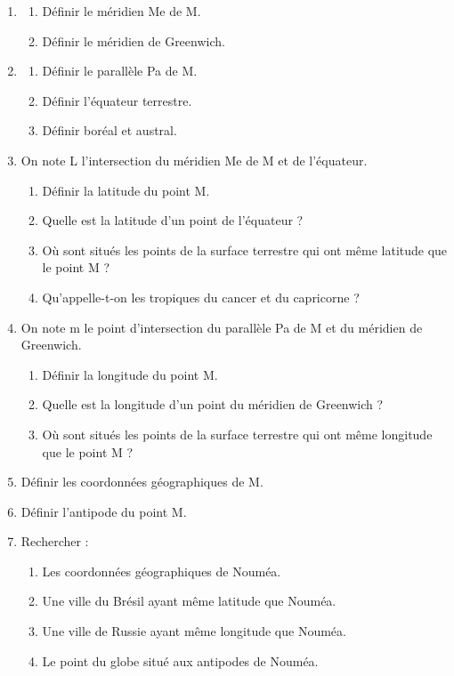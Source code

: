 \begin{multicols}{2}
\begin{enumerate}
\begin{enumerate} 
\item \begin{enumerate}
	\item Définir le méridien Me de M.
	\item Définir le méridien de Greenwich.
		\end{enumerate}
\item \begin{enumerate}
	\item Définir le parallèle Pa de M.
	\item Définir l'équateur terrestre.
	\item Définir boréal et austral.
		\end{enumerate}
\item On note L l'intersection du méridien Me de M et de l'équateur.
	\begin{enumerate}
	\item Définir la latitude du point M.
	\item Quelle est la latitude d'un point de l'équateur ?
	\item Où sont situés les points de la surface terrestre qui ont même latitude que le point M ?
	\item Qu'appelle-t-on les tropiques du cancer et du capricorne ?
	\end{enumerate}
\item On note m le point d'intersection du parallèle Pa de M et du méridien de Greenwich.
	\begin{enumerate}
	\item Définir la longitude du point M.
	\item Quelle est la longitude d'un point du méridien de Greenwich ?
	\item Où sont situés les points de la surface terrestre qui ont même longitude que le point M ?
	\end{enumerate}
\item Définir les coordonnées géographiques de M.
\item Définir l'antipode du point M.
\item Rechercher :
	\begin{enumerate}
	\item Les coordonnées géographiques de Nouméa.
	\item Une ville du Brésil ayant même latitude que Nouméa.
	\item Une ville de Russie ayant même longitude que Nouméa.
	\item Le point du globe situé aux antipodes de Nouméa.


\end{enumerate}
\end{enumerate}
\end{enumerate}
\end{multicols}
